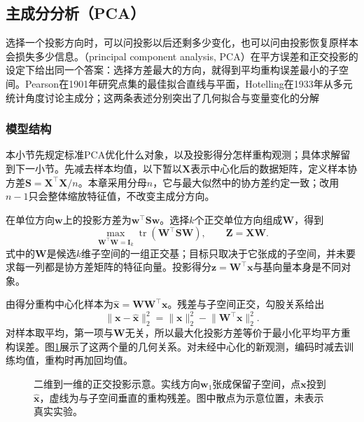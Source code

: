 \subsection{主成分分析（PCA）}
\label{sec:dim-pca}

选择一个投影方向时，可以问投影以后还剩多少变化，也可以问由投影恢复原样本会损失多少信息。（principal component analysis, PCA）在平方误差和正交投影的设定下给出同一个答案：选择方差最大的方向，就得到平均重构误差最小的子空间。Pearson在1901年研究点集的最佳拟合直线与平面，Hotelling在1933年从多元统计角度讨论主成分；这两条表述分别突出了几何拟合与变量变化的分解

\subsubsection{模型结构}
\label{sec:dim-pca-structure}

本小节先规定标准PCA优化什么对象，以及投影得分怎样重构观测；具体求解留到下一小节。先减去样本均值，以下暂以$\bm{X}$表示中心化后的数据矩阵，定义样本协方差$\bm{S}=\bm{X}^{\top}\bm{X}/n$。本章采用分母$n$，它与最大似然中的协方差约定一致；改用$n-1$只会整体缩放特征值，不改变主成分方向。

在单位方向$\bm{w}$上的投影方差为$\bm{w}^{\top}\bm{S}\bm{w}$。选择$k$个正交单位方向组成$\bm{W}$，得到
\begin{equation}
  \max_{\bm{W}^{\top}\bm{W}=\bm{I}_k}
      \operatorname{tr}(\bm{W}^{\top}\bm{S}\bm{W}),
  \qquad \bm{Z}=\bm{X}\bm{W}.
  \label{eq:dim-pca-variance}
\end{equation}
式中的$\bm{W}$是候选$k$维子空间的一组正交基；目标只取决于它张成的子空间，并未要求每一列都是协方差矩阵的特征向量。投影得分$\bm{z}=\bm{W}^{\top}\bm{x}$与基向量本身是不同对象。

由得分重构中心化样本为$\widehat{\bm{x}}=\bm{W}\bm{W}^{\top}\bm{x}$。残差与子空间正交，勾股关系给出
\begin{equation}
  \lVert\bm{x}-\widehat{\bm{x}}\rVert_2^2
  =\lVert\bm{x}\rVert_2^2-\lVert\bm{W}^{\top}\bm{x}\rVert_2^2.
  \label{eq:dim-pca-pythagoras}
\end{equation}
对样本取平均，第一项与$\bm{W}$无关，所以最大化投影方差等价于最小化平均平方重构误差。图\ref{fig:dim-pca-projection}展示了这两个量的几何关系。对未经中心化的新观测，编码时减去训练均值，重构时再加回均值。

\begin{figure}[htbp]
  \centering
  
  \caption{二维到一维的正交投影示意。实线方向$\bm{w}_1$张成保留子空间，点$\bm{x}$投到$\widehat{\bm{x}}$，虚线为与子空间垂直的重构残差。图中散点为示意位置，未表示真实实验。}
  \label{fig:dim-pca-projection}
\end{figure}

